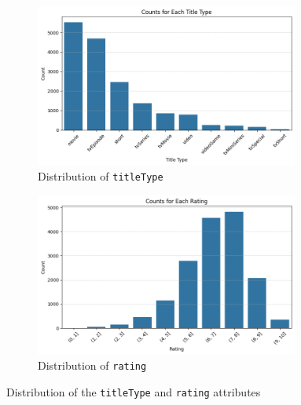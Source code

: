 \begin{figure}[H]
    \centering
    \begin{subfigure}{0.48\textwidth}
        \centering
        \includegraphics[width=0.95\textwidth]{plots/types_count.png}     %
        \caption{Distribution of \texttt{titleType}}
        \captionsetup{width=0.9\linewidth, justification=centering}
        \label{fig:titleType_distrib}
    \end{subfigure}
    \begin{subfigure}{0.48\textwidth}
        \centering
        \includegraphics[width=0.95\textwidth]{plots/rating_distrib.png}     %
        \caption{Distribution of \texttt{rating}}
        \captionsetup{width=0.9\linewidth, justification=centering}
        \label{fig:rating_distrib}
    \end{subfigure}
    \captionsetup{justification=centering}
    \caption{Distribution of the \texttt{titleType} and \texttt{rating} attributes}
    \label{fig:distrib}
\end{figure}


